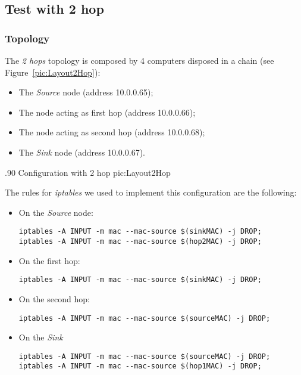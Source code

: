\subsection{Test with 2 hop} \label{subsec:2hop}

    \subsubsection{Topology}

        The \emph{2 hops} topology is composed by 4 computers disposed
        in a chain (see Figure~\ref{pic:Layout2Hop}):
        \begin{itemize}
        \item   The \emph{Source} node (address 10.0.0.65);
        \item   The node acting as first hop (address 10.0.0.66);
        \item   The node acting as second hop (address 10.0.0.68);
        \item   The \emph{Sink} node (address 10.0.0.67).
        \end{itemize}

                {.90\columnwidth}
                {Configuration with 2 hop}
                {pic:Layout2Hop}

        \noindent The rules for \emph{iptables} we used to implement this
        configuration are the following:

        \begin{itemize}
        \item On the \emph{Source} node:
        \begin{verbatim}
iptables -A INPUT -m mac --mac-source $(sinkMAC) -j DROP;
iptables -A INPUT -m mac --mac-source $(hop2MAC) -j DROP;
        \end{verbatim}

        \item On the first hop:
        \begin{verbatim}
iptables -A INPUT -m mac --mac-source $(sinkMAC) -j DROP;
        \end{verbatim}

        \item On the second hop:
        \begin{verbatim}
iptables -A INPUT -m mac --mac-source $(sourceMAC) -j DROP;
        \end{verbatim}

        \item On the \emph{Sink}
        \begin{verbatim}
iptables -A INPUT -m mac --mac-source $(sourceMAC) -j DROP;
iptables -A INPUT -m mac --mac-source $(hop1MAC) -j DROP;
        \end{verbatim}

        \end{itemize}

